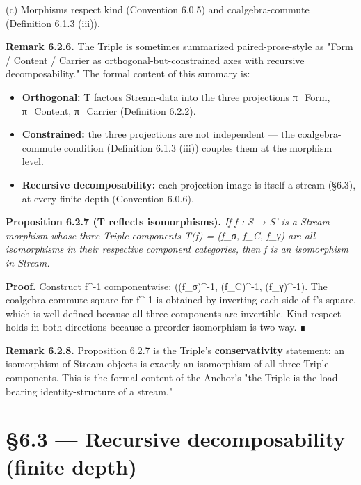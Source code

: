\documentclass[11pt, openany]{book}
\newcommand{\sectionbreak}{\clearpage}
\begin{document}
(c) Morphisms respect kind (Convention 6.0.5) and coalgebra-commute (Definition 6.1.3 (iii)).

\textbf{Remark 6.2.6.} The Triple is sometimes summarized paired-prose-style as "Form / Content / Carrier as orthogonal-but-constrained axes with recursive decomposability." The formal content of this summary is:

\begin{itemize}
\item \textbf{Orthogonal:} T factors Stream-data into the three projections π\_\allowbreak{}Form, π\_\allowbreak{}Content, π\_\allowbreak{}Carrier (Definition 6.2.2).
\item \textbf{Constrained:} the three projections are not independent --- the coalgebra-commute condition (Definition 6.1.3 (iii)) couples them at the morphism level.
\item \textbf{Recursive decomposability:} each projection-image is itself a stream (§6.3), at every finite depth (Convention 6.0.6).
\end{itemize}

\textbf{Proposition 6.2.7 (T reflects isomorphisms).} \textit{If f : S → S' is a Stream-morphism whose three Triple-components T(f) = (f\_\allowbreak{}σ, f\_\allowbreak{}C, f\_\allowbreak{}γ) are all isomorphisms in their respective component categories, then f is an isomorphism in Stream.}

\textbf{Proof.} Construct f\textasciicircum{}{-1} componentwise: ((f\_\allowbreak{}σ)\textasciicircum{}{-1}, (f\_\allowbreak{}C)\textasciicircum{}{-1}, (f\_\allowbreak{}γ)\textasciicircum{}{-1}). The coalgebra-commute square for f\textasciicircum{}{-1} is obtained by inverting each side of f's square, which is well-defined because all three components are invertible. Kind respect holds in both directions because a preorder isomorphism is two-way. ∎

\textbf{Remark 6.2.8.} Proposition 6.2.7 is the Triple's \textbf{conservativity} statement: an isomorphism of Stream-objects is exactly an isomorphism of all three Triple-components. This is the formal content of the Anchor's "the Triple is the load-bearing identity-structure of a stream."

\sectionbreak

\section{§6.3 --- Recursive decomposability (finite depth)}
\end{document}
